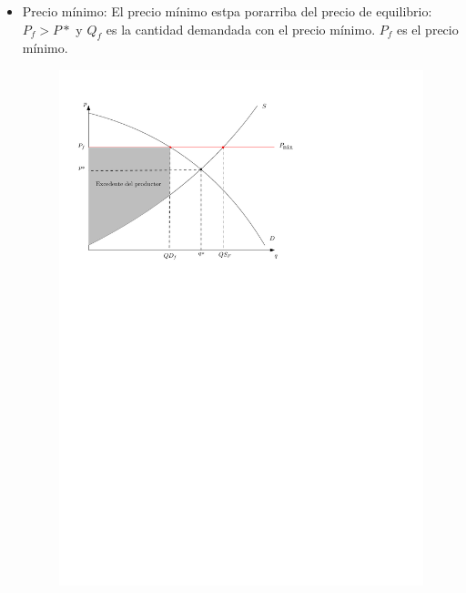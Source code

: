 \begin{itemize}
    \item Precio mínimo: El precio mínimo estpa porarriba del precio de equilibrio: $\displaystyle P_f > P*$ y $\displaystyle Q_f$ es la cantidad demandada con el precio mínimo. $\displaystyle P_f$ es el precio mínimo.  
        \begin{figure}[!htb]
            \centering
            \includegraphics[]{Clases/figs/04} 
        \end{figure}
        

\end{itemize}
